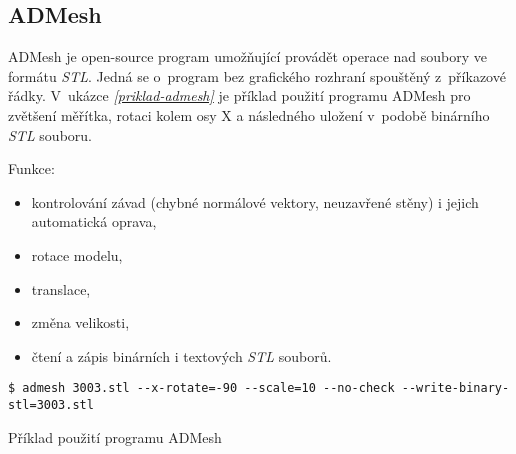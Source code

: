 \subsection{ADMesh}\label{podsekce-admesh}
ADMesh \autocite{ADMesh} je open-source program umožňující provádět operace nad soubory ve formátu \textit{\gls{STL}}. Jedná se o~program bez grafického rozhraní spouštěný z~příkazové řádky. V~ukázce \emph{\ref{priklad-admesh}} je příklad použití programu ADMesh pro zvětšení měřítka, rotaci kolem osy X a následného uložení v~podobě binárního \textit{\gls{STL}} souboru.

Funkce:
\begin{itemize}
    \item kontrolování závad (chybné normálové vektory, neuzavřené stěny) i jejich automatická oprava,
    \item rotace modelu,
    \item translace,
    \item změna velikosti,
    \item čtení a zápis binárních i textových \textit{\gls{STL}} souborů.
\end{itemize}

\begin{listing}[htbp]
        \begin{verbatim}
$ admesh 3003.stl --x-rotate=-90 --scale=10 --no-check --write-binary-stl=3003.stl
        \end{verbatim}
    \caption{Příklad použití programu ADMesh \label{priklad-admesh}}
\end{listing}
